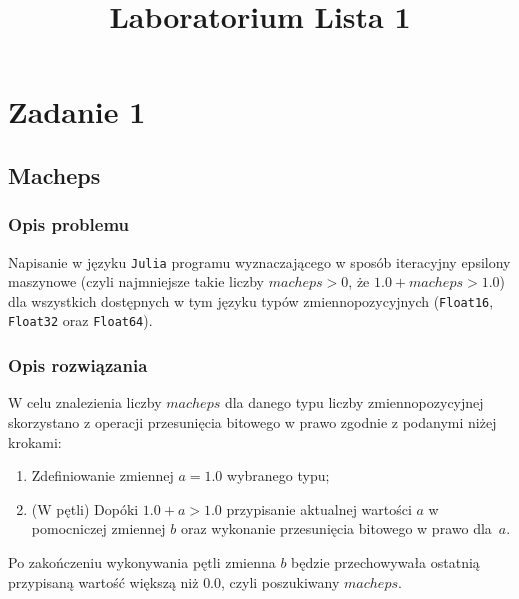 \documentclass{classrep}
\author{
  \studentinfo{Agata Jasionowska}{229726}
}
\title{Laboratorium \ppauza Lista 1}
\begin{document}
\maketitle

\section{Zadanie 1}
	\subsection{Macheps}
		\subsubsection{Opis problemu}
			Napisanie w języku \texttt{Julia} programu wyznaczającego w sposób iteracyjny epsilony 
			maszynowe (czyli najmniejsze takie liczby $macheps > 0$, że $1.0 + macheps > 1.0$) 
			dla wszystkich dostępnych w tym języku typów zmiennopozycyjnych (\texttt{Float16},
			\texttt{Float32} oraz \texttt{Float64}).
		\subsubsection{Opis rozwiązania}
			W celu znalezienia liczby $macheps$ dla danego typu liczby zmiennopozycyjnej
			skorzystano	z operacji przesunięcia bitowego w prawo zgodnie z podanymi niżej krokami:
			\begin{enumerate}
				\item Zdefiniowanie zmiennej $a = 1.0$ wybranego typu;
				\item (W pętli) Dopóki $1.0 + a > 1.0$ przypisanie aktualnej wartości $a$ w pomocniczej 
				zmiennej $b$ oraz wykonanie przesunięcia bitowego w prawo dla~$a$.
			\end{enumerate}
			Po zakończeniu wykonywania pętli zmienna	$b$ będzie przechowywała ostatnią przypisaną wartość większą niż $0.0$, czyli 
			poszukiwany $macheps$.
\end{document}
